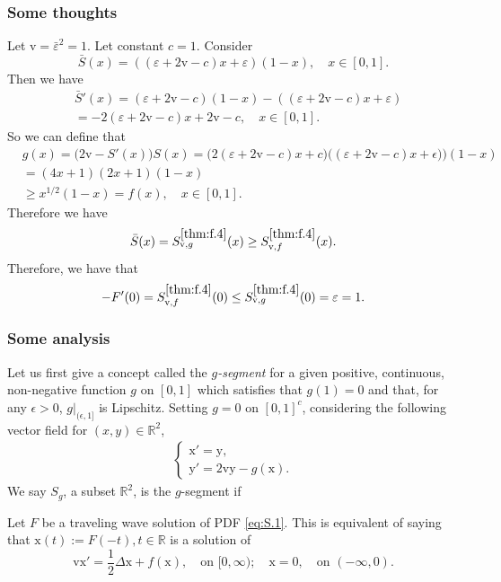 \documentclass[12pt,a4paper]{amsart}
\numberwithin{equation}{section}
\theoremstyle{plain}
\theoremstyle{remark}
\begin{document}
\subsubsection{Some thoughts}
Let $\mathrm v = \bar \varepsilon^2  = 1$. 
Let constant $c = 1$.
Consider 
\[
\bar S(x) = ((\varepsilon+2\mathrm v - c)x+\varepsilon)(1-x), \quad x\in [0,1].
\]
Then we have
\begin{align}
&\bar S'(x) 
= (\varepsilon + 2\mathrm v  - c) (1-x) - ((\varepsilon + 2\mathrm v - c) x + \varepsilon)
\\ &=  -2(\varepsilon + 2\mathrm v - c) x + 2\mathrm v  - c, \quad x\in [0,1].
\end{align}
So we can define that
\begin{align}
&g(x) = \big(2\mathrm v - S'(x)\big) S(x)  =  \big(2(\varepsilon + 2\mathrm v - c)x + c\big) \big((\varepsilon+2\mathrm v - c)x+\epsilon)\big)(1-x)
\\& =(4x +1) (2x+1) (1-x) 
\\&\geq x^{1/2}(1-x) = f(x), \quad x\in [0,1]. 
\end{align}
Therefore we have
\[
\bar S(x) = S_{\mathrm v, g}^{\ref{thm:f.4}}(x)
\geq S_{\mathrm v, f}^{\ref{thm:f.4}}(x).
\]
Therefore, we have that
\[
- F'(0) = S_{\mathrm v, f}^{\ref{thm:f.4}}(0) \leq S_{\mathrm v, g}^{\ref{thm:f.4}}(0) = \varepsilon = 1.
\]
\subsubsection{Some analysis}
Let us first give a concept called the \emph{$g$-segment} for a given positive, continuous, non-negative function $g$ on $[0,1]$ which satisfies that $g(1) = 0$ and that, for any $\epsilon>0$, $g|_{(\epsilon, 1]}$ is Lipschitz.
Setting $g = 0$ on $[0,1]^c$, considering the following vector field for $(x,y) \in \mathbb R^2$,
\begin{align}
\begin{cases}
\mathrm x' =  \mathrm y,\\
\mathrm y' = 2\mathrm v \mathrm y - g(\mathrm x).
\end{cases}
\end{align}
We say $S_g$, a subset $\mathbb R^2$, is the $g$-segment if 

Let $F$ be a traveling wave solution of PDF \eqref{eq:S.1}. 
This is equivalent of saying that $\mathrm x(t):= F(-t), t\in \mathbb R$ is a solution of 
\[
\mathrm v \mathrm x' = \frac{1}{2} \Delta \mathrm x + f(\mathrm x), \quad \text{on } [0,\infty); \quad \mathrm x = 0, \quad \text{on } (-\infty, 0).
\]
\end{document}
